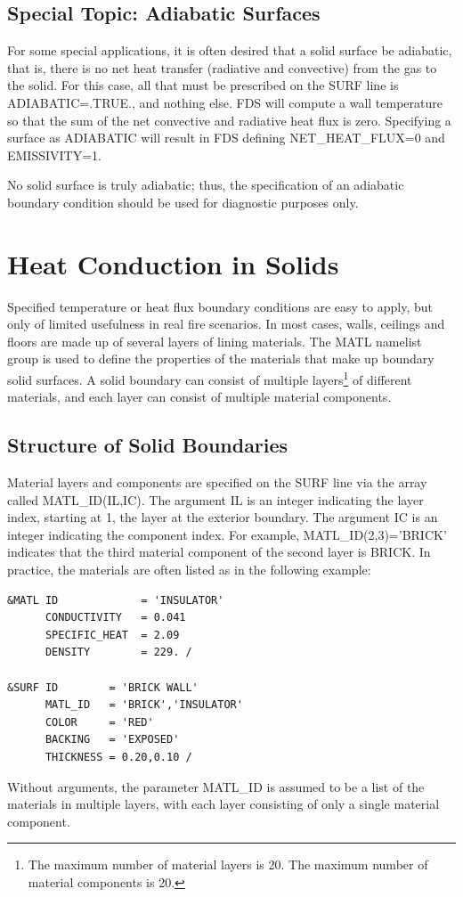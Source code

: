 \documentclass[11pt]{book}
\begin{document}
\subsection{Special Topic: Adiabatic Surfaces}
\label{info:adiabatic}

For some special applications, it is often desired that a solid
surface be adiabatic, that is, there is no net heat transfer
(radiative and convective) from the gas to the solid. For this case,
all that must be prescribed on the {\ct SURF} line is {\ct ADIABATIC=.TRUE.}, and nothing else.  FDS will compute a wall temperature
so that the sum of the net convective and radiative heat flux is zero.  Specifying a surface as {\ct ADIABATIC} will
result in FDS defining {\ct NET\_HEAT\_FLUX=0} and {\ct EMISSIVITY=1}.


No solid surface is truly adiabatic; thus, the specification of an adiabatic boundary condition should be used for diagnostic purposes only.



\clearpage


\section{Heat Conduction in Solids}
\label{info:MATL}

Specified temperature or heat flux boundary conditions are
easy to apply, but only of limited usefulness in real fire scenarios.
In most cases, walls, ceilings and floors are made up of several layers
of lining materials. The {\ct MATL} namelist group is used to define the properties of the materials that make
up boundary solid surfaces. A solid boundary can consist of
multiple layers\footnote{The maximum number of material layers is 20. The maximum number of material components is 20.} of different
materials, and each layer can consist of multiple material
components.

\subsection{Structure of Solid Boundaries}

Material layers and components are
specified on the {\ct SURF} line via the array called {\ct MATL\_ID(IL,IC)}.
The argument {\ct IL} is an integer indicating the
layer index, starting at 1, the layer at the exterior boundary. The
argument {\ct IC} is an integer indicating the component index. For
example, {\ct MATL\_ID(2,3)='BRICK'} indicates that the third material
component of the second layer is {\ct BRICK}. In practice, the
materials are often listed as in the following example:
\begin{lstlisting}
&MATL ID             = 'INSULATOR'
      CONDUCTIVITY   = 0.041
      SPECIFIC_HEAT  = 2.09
      DENSITY        = 229. /

&SURF ID        = 'BRICK WALL'
      MATL_ID   = 'BRICK','INSULATOR'
      COLOR     = 'RED'
      BACKING   = 'EXPOSED'
      THICKNESS = 0.20,0.10 /
\end{lstlisting}
Without arguments, the parameter {\ct MATL\_ID} is assumed to be a list of the materials in multiple layers, with each layer consisting of only a single material component.
\end{document}

